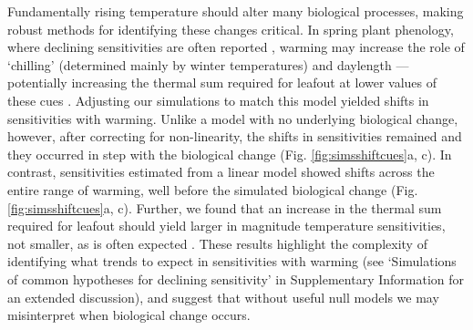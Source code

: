 \documentclass[11pt,letter]{article}
\begin{document}
Fundamentally rising temperature should alter many biological processes, making robust methods for identifying these changes critical. In spring plant phenology, where declining sensitivities are often reported \citep{fu2015,piao2017,dai2019ag}, warming may increase the role of `chilling' (determined mainly by winter temperatures) and daylength \citep{Laube:2014a,zohner2016}---potentially increasing the thermal sum required for leafout at lower values of these cues \citep{Polgar2014,zohner2017}. Adjusting our simulations to match this model yielded shifts in sensitivities with warming. Unlike a model with no underlying biological change, however, after correcting for non-linearity, the shifts in sensitivities remained and they occurred in step with the biological change (Fig. \ref{fig:simsshiftcues}a, c). In contrast, sensitivities estimated from a linear model showed shifts across the entire range of warming, well before the simulated biological change (Fig. \ref{fig:simsshiftcues}a, c). Further, we found that an increase in the thermal sum required for leafout should yield larger in magnitude temperature sensitivities, not smaller, as is often expected \citep[e.g.,][]{fu2015}. These results highlight the complexity of identifying what trends to expect in sensitivities with warming (see `Simulations of common hypotheses for declining sensitivity' in Supplementary Information for an extended discussion), and suggest that without useful null models we may misinterpret when biological change occurs.  \\ %


\end{document}
